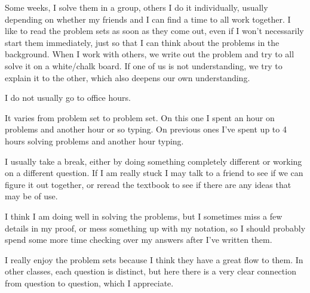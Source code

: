\documentclass{hmwk}
\begin{document}
\begin{solution}
Some weeks, I solve them in a group, others I do it individually, usually depending on whether my friends and I can find a time to all work together. I like to read the problem sets as soon as they come out, even if I won't necessarily start them immediately, just so that I can think about the problems in the background. When I work with others, we write out the problem and try to all solve it on a white/chalk board. If one of us is not understanding, we try to explain it to the other, which also deepens our own understanding. 

I do not usually go to office hours. 

It varies from problem set to problem set. On this one I spent an hour on problems and another hour or so typing. On previous ones I've spent up to 4 hours solving problems and another hour typing.

I usually take a break, either by doing something completely different or working on a different question. If I am really stuck I may talk to a friend to see if we can figure it out together, or reread the textbook to see if there are any ideas that may be of use. 

I think I am doing well in solving the problems, but I sometimes miss a few details in my proof, or mess something up with my notation, so I should probably spend some more time checking over my answers after I've written them. 

I really enjoy the problem sets because I think they have a great flow to them. In other classes, each question is distinct, but here there is a very clear connection from question to question, which I appreciate.
\end{solution}
\end{document}
